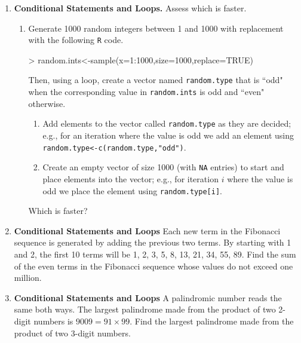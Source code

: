\documentclass{article}
\begin{document}
\begin{enumerate}
  \item \textbf{Conditional Statements and Loops.} Assess which is faster.
  \begin{enumerate}
    \item Generate 1000 random integers between 1 and 1000 with replacement with
    the following \texttt{R} code.
\begin{Schunk}
\begin{Sinput}
> random.ints<-sample(x=1:1000,size=1000,replace=TRUE)
\end{Sinput}
\end{Schunk}
    Then, using a loop, create a vector named \texttt{random.type} that is ``odd"
    when the corresponding value in \texttt{random.ints} is odd and ``even" otherwise.
    \begin{enumerate}
      \item Add elements to the vector called \texttt{random.type} as they
      are decided; e.g., for an iteration where the value is odd we add
      an element using \texttt{random.type<-c(random.type,"odd")}.
      \item Create an empty vector of size 1000 (with \texttt{NA} entries) to 
      start and place elements into the vector; e.g., for iteration $i$
      where the value is odd we place the element using \texttt{random.type[i]}.
    \end{enumerate}
    Which is faster?
\end{enumerate}
  \item \textbf{Conditional Statements and Loops} Each new term in the Fibonacci sequence is 
  generated by adding the previous two terms. By starting with 1 and 2, the first 
  10 terms will be 1, 2, 3, 5, 8, 13, 21, 34, 55, 89. Find the sum of the even terms in the 
  Fibonacci sequence whose values do not exceed one million.
  
  \item  \textbf{Conditional Statements and Loops} A palindromic number reads the same 
  both ways. The largest palindrome made from the product of two 2-digit numbers is 
  $9009 = 91 \times 99$. Find the largest palindrome made from the product of two 3-digit numbers.
  

\end{enumerate}
\end{document}
